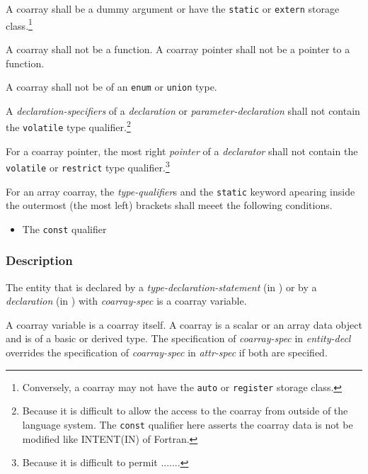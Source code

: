 \begin{Constraints C}
\item A coarray shall be a dummy argument or have the {\tt static} or {\tt extern} 
storage class.\footnote
{Conversely, a coarray may not have the {\tt auto} or {\tt register} 
storage class.}

\item A coarray shall not be a function. 
A coarray pointer shall not be a pointer to a function.

\item A coarray shall not be of an {\tt enum} or {\tt union} type.

\item A {\it declaration-specifiers} of a {\it declaration} or 
{\it parameter-declaration} shall not contain the {\tt volatile} type qualifier.\footnote
{Because it is difficult to allow the access to the coarray from outside of the 
language system.
The {\tt const} qualifier here asserts the coarray data is not be modified 
like INTENT(IN) of Fortran.}

\item For a coarray pointer, the most right {\it pointer} of a {\it declarator} 
shall not contain the {\tt volatile} or {\tt restrict} type qualifier.\footnote
{Because it is difficult to permit .......}

\item For an array coarray, the {\it type-qualifier}s and the {\tt static} keyword
apearing inside the outermost (the most left) brackets shall meeet the following conditions.
 \begin{itemize}
 \item The {\tt const} qualifier
 \end{itemize}

\end{Constraints C}


\subsubsection*{Description}

The entity that is declared
by a {\it type-declaration-statement} (in {\XMPF}) or 
by a {\it declaration} (in {\XMPC})
with {\it coarray-spec} is a coarray variable.

{\onlyF} A coarray variable is a coarray itself.
A coarray is a scalar or an array data object and is of a basic or derived type.
The specification of {\it coarray-spec} in {\it entity-decl} 
overrides the specification of {\it coarray-spec} in {\it attr-spec}
if both are specified.

